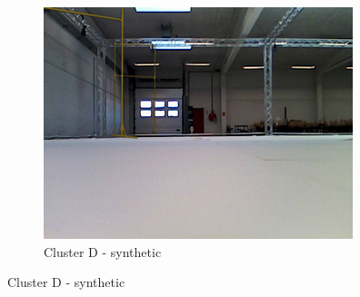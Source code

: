 \begin{figure}[h!]
\begin{subfigure}{0.32\textwidth}
      \includegraphics[width=\textwidth]{figure/tsne_random/D/4.png}
      \caption{Cluster D - synthetic}
   \end{subfigure}


\end{figure}
